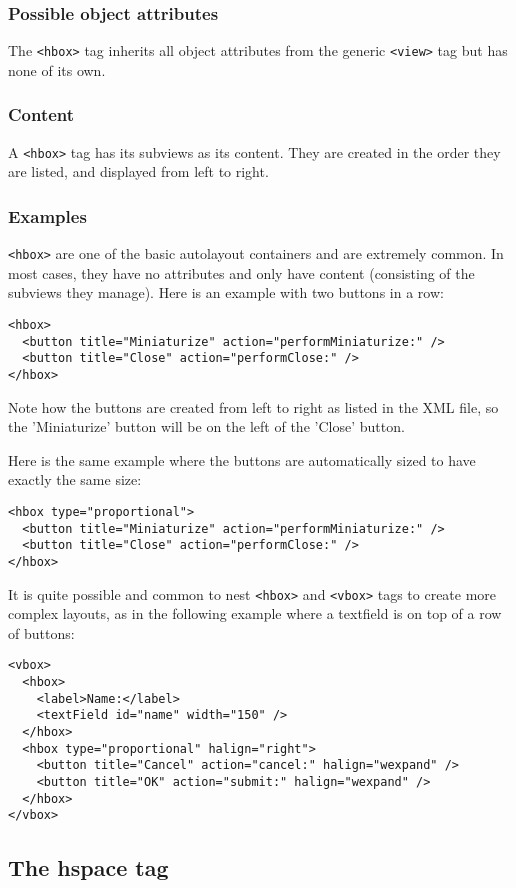 \subsubsection{Possible object attributes}
The \texttt{<hbox>} tag inherits all object attributes from the
generic \texttt{<view>} tag but has none of its own.

\subsubsection{Content}
A \texttt{<hbox>} tag has its subviews as its content.  They are
created in the order they are listed, and displayed from left to
right.

\subsubsection{Examples}
\texttt{<hbox>} are one of the basic autolayout containers and are
extremely common.  In most cases, they have no attributes and only
have content (consisting of the subviews they manage).  Here is an
example with two buttons in a row:
\begin{verbatim}
<hbox>
  <button title="Miniaturize" action="performMiniaturize:" />
  <button title="Close" action="performClose:" />
</hbox>
\end{verbatim}
Note how the buttons are created from left to right as listed in the
XML file, so the 'Miniaturize' button will be on the left of the
'Close' button.

Here is the same example where the buttons are automatically sized
to have exactly the same size:
\begin{verbatim}
<hbox type="proportional">
  <button title="Miniaturize" action="performMiniaturize:" />
  <button title="Close" action="performClose:" />
</hbox>
\end{verbatim}

It is quite possible and common to nest \texttt{<hbox>} and
\texttt{<vbox>} tags to create more complex layouts, as in the
following example where a textfield is on top of a row
of buttons:
\begin{verbatim}
<vbox>
  <hbox>
    <label>Name:</label>
    <textField id="name" width="150" />
  </hbox>
  <hbox type="proportional" halign="right">
    <button title="Cancel" action="cancel:" halign="wexpand" />
    <button title="OK" action="submit:" halign="wexpand" />
  </hbox>
</vbox>
\end{verbatim}

\subsection{The hspace tag}

